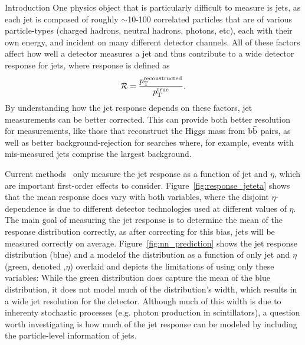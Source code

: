 \begin{section}{Introduction}
One physics object that is particularly difficult to measure is jets, as each jet is composed of roughly $\sim$10-100 correlated particles that are of various particle-types (charged hadrons, neutral hadrons, photons, etc), each with their own energy, and incident on many different detector channels.
All of these factors affect how well a detector measures a jet and thus contribute to a wide detector response for jets, where response is defined as
\begin{align}
\mathcal{R} = \frac{p_{\mathrm{T}}^{\text{reconstructed}}}{p_{\mathrm{T}}^{\text{true}}}.
\end{align}
By understanding how the jet response depends on these factors, jet measurements can be better corrected.
This can provide both better resolution for measurements, like those that reconstruct the Higgs mass from $\mathrm{b\bar{b}}$ pairs, as well as better background-rejection for searches where, for example, events with mis-measured jets comprise the largest background.

Current methods~\cite{Khachatryan:2016kdb,Aaboud:2017jcu} only measure the jet response as a function of jet \pT and $\eta$, which are important first-order effects to consider.
Figure~\ref{fig:response_jeteta} shows that the mean response does vary with both variables, where the disjoint $\eta$-dependence is due to different detector technologies used at different values of $\eta$.
The main goal of measuring the jet response is to determine the mean of the response distribution correctly, as after correcting for this bias, jets will be measured correctly on average.
Figure~\ref{fig:nn_prediction} shows the jet response distribution (blue) and a model\footnotemark[1] of the distribution as a function of only jet \pT and $\eta$ (green, denoted \pT,$\eta$) overlaid and depicts the limitations of using only these variables:
While the green distribution does capture the mean of the blue distribution, it does not model much of the distribution's width, which results in a wide jet resolution for the detector.
Although much of this width is due to inherenty stochastic processes (e.g. photon production in scintillators), a question worth investigating is how much of the jet response can be modeled by including the particle-level information of jets.


\end{section}
